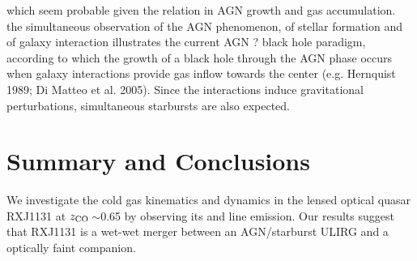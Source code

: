\documentclass[]{emulateapj}
\begin{document}
which seem probable given the relation in AGN growth and gas accumulation.
the simultaneous observation of the AGN phenomenon, of stellar formation and of galaxy interaction illustrates the current AGN ? black hole paradigm, according to which the growth of a black hole through the AGN phase occurs when galaxy interactions provide gas inflow towards the center (e.g. Hernquist 1989; Di Matteo et al. 2005). Since the interactions induce gravitational perturbations, simultaneous starbursts are also expected. 
 

\section{Summary and Conclusions} \label{sec:sum}


We investigate the cold gas kinematics and dynamics in
the lensed optical quasar RXJ1131 at $z_{\rm CO}$\,$\sim$0.65
by observing its \bco and \cco line emission.
Our results suggest that RXJ1131 is a wet-wet merger between an AGN/starburst
ULIRG and a optically faint companion.


\end{document}
